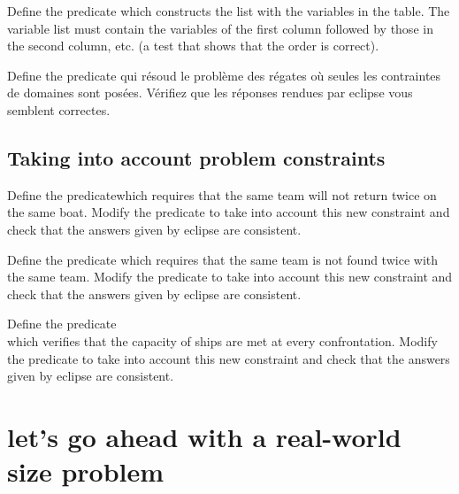 \begin{question}
  Define the predicate  which constructs the
  list  with the variables in the table. The variable list must contain the variables of the first column followed by those in the second column, etc. (a test that shows that the order is correct).
  \end{question}

\begin{question}
 Define the predicate   qui résoud le problème des régates où seules les contraintes de domaines sont posées. 
Vérifiez que les réponses rendues par eclipse vous semblent correctes. 
\end{question}

\subsection{Taking into account problem constraints}

\begin{question}
 Define the predicatewhich requires that the same team will not return twice on the same boat.
Modify the predicate  to take into account this new constraint and check that the answers given by eclipse are consistent.\end{question}

\begin{question}
 Define the predicate which requires that the same team is not found twice with the same team.
Modify the predicate  to take into account this new constraint and check that the answers given by eclipse are consistent.
\end{question}

\begin{question}
 Define the predicate \\  which verifies that the capacity of ships are met at every confrontation.
Modify the predicate  to take into account this new constraint and check that the answers given by eclipse are consistent.\end{question}

\section{let's go ahead with a real-world size problem}

